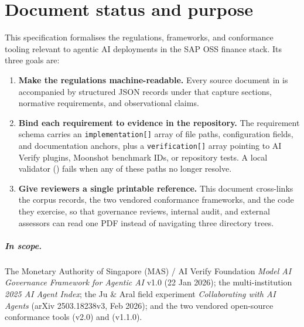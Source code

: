 
\chapter*{Document status and purpose}

This specification formalises the regulations, frameworks, and conformance
tooling relevant to agentic AI deployments in the SAP OSS finance stack. Its
three goals are:

\begin{enumerate}
  \item \textbf{Make the regulations machine-readable.} Every source document
        in  is accompanied by structured JSON records under
         that capture sections, normative requirements,
        and observational claims.
  \item \textbf{Bind each requirement to evidence in the repository.} The
        requirement schema carries an \texttt{implementation[]} array of file
        paths, configuration fields, and documentation anchors, plus a
        \texttt{verification[]} array pointing to AI Verify plugins, Moonshot
        benchmark IDs, or repository tests. A local validator
        () fails when any of these paths no
        longer resolve.
  \item \textbf{Give reviewers a single printable reference.} This document
        cross-links the corpus records, the two vendored conformance
        frameworks, and the code they exercise, so that governance reviews,
        internal audit, and external assessors can read one PDF instead of
        navigating three directory trees.
\end{enumerate}

\paragraph{In scope.} The Monetary Authority of Singapore (MAS) / AI Verify
Foundation \emph{Model AI Governance Framework for Agentic AI} v1.0 (22 Jan
2026); the multi-institution \emph{2025 AI Agent Index}; the Ju \& Aral field
experiment \emph{Collaborating with AI Agents} (arXiv 2503.18238v3, Feb 2026);
and the two vendored open-source conformance tools
 (v2.0) and  (v1.1.0).

